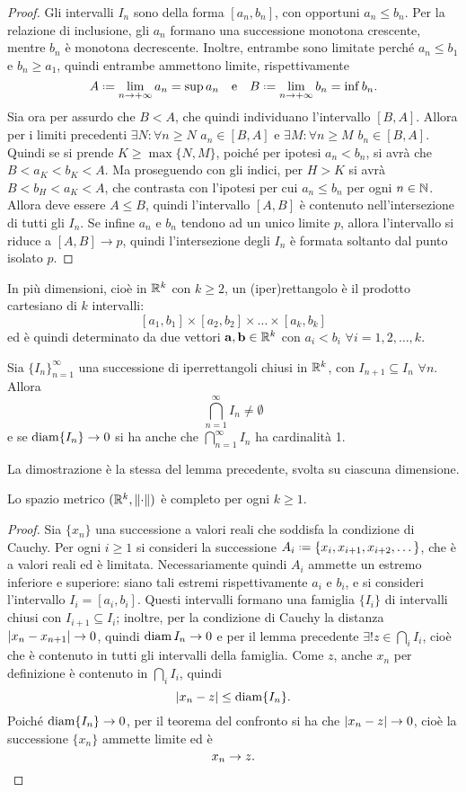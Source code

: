 \begin{proof}
Gli intervalli $I_n$ sono della forma $[a_n,b_n]$, con opportuni $a_n\leq b_n$. Per la relazione di inclusione, gli $a_n$ formano una successione monotona crescente, mentre $b_n$ è monotona decrescente. Inoltre, entrambe sono limitate perché $a_n\leq b_1$ e $b_n\geq a_1$, quindi entrambe ammettono limite, rispettivamente
\[
A\defeq\lim_{n\to+\infty}a_n=\sup a_n\qtext{e}B\defeq\lim_{n\to+\infty}b_n=\inf b_n.
\]
Sia ora per assurdo che $B<A$, che quindi individuano l'intervallo $[B,A]$. Allora per i limiti precedenti $\exists N\colon\forall n\geq N$ $a_n\in[B,A]$ e $\exists M\colon\forall n\geq M$ $b_n\in[B,A]$. Quindi se si prende $K\geq\max\{N,M\}$, poiché per ipotesi $a_n<b_n$, si avrà che $B<a_K<b_K<A$. Ma proseguendo con gli indici, per $H>K$ si avrà $B<b_H<a_K<A$, che contrasta con l'ipotesi per cui $a_n\leq b_n$ per ogni $n\in\mathbb{N}$. Allora deve essere $A\leq B$, quindi l'intervallo $[A,B]$ è contenuto nell'intersezione di tutti gli $I_n$. Se infine $a_n$ e $b_n$ tendono ad un unico limite $p$, allora l'intervallo si riduce a $[A,B]\to p$, quindi l'intersezione degli $I_n$ è formata soltanto dal punto isolato $p$.
\end{proof}
In più dimensioni, cioè in $\mathbb{R}^k$ con $k\geq 2$, un (iper)rettangolo è il prodotto cartesiano di $k$ intervalli:
\[
[a_1,b_1]\times[a_2,b_2]\times\dots\times[a_k,b_k]
\]
ed è quindi determinato da due vettori $\mathbf{a},\mathbf{b}\in\mathbb{R}^k$ con $a_i<b_i$ $\forall i=1,2,\dots,k$.
\begin{lemma}
Sia $\{I_n\}_{n=1}^{\infty}$ una successione di iperrettangoli chiusi in $\mathbb{R}^k$, con $I_{n+1}\subseteq I_n$ $\forall n$. Allora
\[
\bigcap_{n=1}^{\infty} I_n\neq\emptyset
\]
e se $\operatorname{diam}\{I_n\}\to 0$ si ha anche che $\bigcap_{n=1}^{\infty} I_n$ ha cardinalità 1.
\end{lemma}
La dimostrazione è la stessa del lemma precedente, svolta su ciascuna dimensione.
\begin{teorema}
\label{t:completo}
Lo spazio metrico $(\mathbb{R}^k,\lVert\cdot\rVert)$ è completo per ogni $k\geq 1$.
\end{teorema}
\begin{proof}
Sia $\{x_n\}$ una successione a valori reali che soddisfa la condizione di Cauchy. Per ogni $i\geq 1$ si consideri la successione $A_i\defeq\{x_i,x_{i+1},x_{i+2},\dots\}$, che è a valori reali ed è limitata. Necessariamente quindi $A_i$ ammette un estremo inferiore e superiore: siano tali estremi rispettivamente $a_i$ e $b_i$, e si consideri l'intervallo $I_i=[a_i,b_i]$.
Questi intervalli formano una famiglia $\{I_i\}$ di intervalli chiusi con $I_{i+1}\subseteq I_i$; inoltre, per la condizione di Cauchy la distanza $\lvert x_n-x_{n+1}\rvert\to 0$, quindi $\operatorname{diam} I_n\to 0$ e per il lemma precedente $\exists! z\in\bigcap\nolimits _i I_i$, cioè che è contenuto in tutti gli intervalli della famiglia. Come $z$, anche $x_n$ per definizione è contenuto in $\bigcap\nolimits _i I_i$, quindi
\[
\lvert x_n-z\rvert\leq\operatorname{diam}\{I_n\}.
\]
Poiché $\operatorname{diam}\{I_n\}\to 0$, per il teorema del confronto si ha che $\lvert x_n-z\rvert\to 0$, cioè la successione $\{x_n\}$ ammette limite ed è
\[
x_n\to z.\qedhere
\]
\end{proof}
